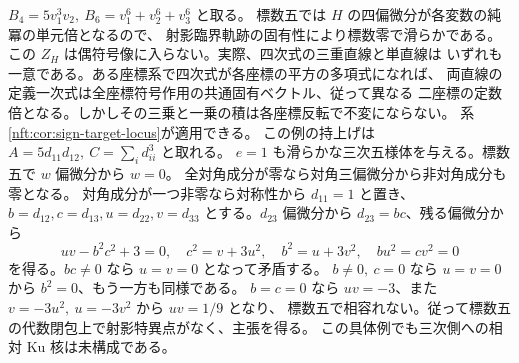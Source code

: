 \begin{example}\label{vcd:ex:non-sign}
$B_4=5v_1^3v_2,\ B_6=v_1^6+v_2^6+v_3^6$ と取る。
標数五では $H$ の四偏微分が各変数の純冪の単元倍となるので、
射影臨界軌跡の固有性により標数零で滑らかである。
この $Z_H$ は偶符号像に入らない。実際、四次式の三重直線と単直線は
いずれも一意である。ある座標系で四次式が各座標の平方の多項式になれば、
両直線の定義一次式は全座標符号作用の共通固有ベクトル、従って異なる
二座標の定数倍となる。しかしその三乗と一乗の積は各座標反転で不変にならない。
系\ref{nft:cor:sign-target-locus}が適用できる。
この例の持上げは $A=5d_{11}d_{12},\ C=\sum_i d_{ii}^3$ と取れる。
$e=1$ も滑らかな三次五様体を与える。標数五で $w$ 偏微分から $w=0$。
全対角成分が零なら対角三偏微分から非対角成分も零となる。
対角成分が一つ非零なら対称性から $d_{11}=1$ と置き、
$b=d_{12},c=d_{13},u=d_{22},v=d_{33}$ とする。$d_{23}$ 偏微分から
$d_{23}=bc$、残る偏微分から
\[
 uv-b^2c^2+3=0,\quad c^2=v+3u^2,\quad b^2=u+3v^2,
 \quad b u^2=c v^2=0
\]
を得る。$bc\ne0$ なら $u=v=0$ となって矛盾する。
$b\ne0,\ c=0$ なら $u=v=0$ から $b^2=0$、もう一方も同様である。
$b=c=0$ なら $uv=-3$、また $v=-3u^2,\ u=-3v^2$ から $uv=1/9$ となり、
標数五で相容れない。従って標数五の代数閉包上で射影特異点がなく、主張を得る。
この具体例でも三次側への相対 Ku 核は未構成である。
\end{example}
